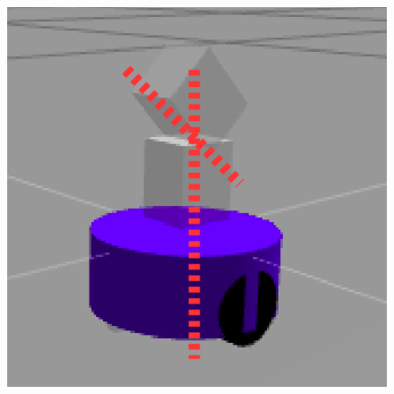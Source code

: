 \documentclass[conference]{IEEEtran}
\begin{document}
\begin{figure}[H]
\begin{minipage}{.45\linewidth}
  \includegraphics[width=\linewidth]{tilt.png}
  \label{fig:tilt}
\end{minipage}
\end{figure}
\end{document}
